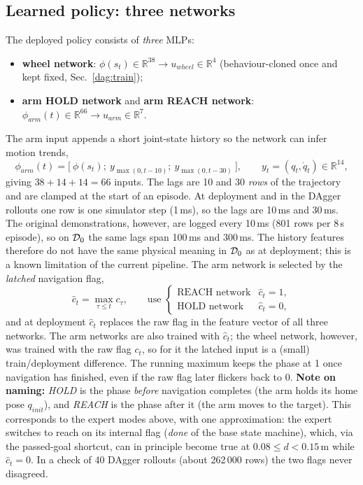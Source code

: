 \subsection{Learned policy: three networks}
\label{dag:policy}

The deployed policy consists of \emph{three} MLPs:
\begin{itemize}
  \item \textbf{wheel network}: $\phi(s_t)\in\mathbb{R}^{38}\to u_{wheel}\in\mathbb{R}^4$ (behaviour-cloned once and kept fixed, Sec.~\ref{dag:train});
  \item \textbf{arm HOLD network} and \textbf{arm REACH network}: $\phi_{arm}(t)\in\mathbb{R}^{66}\to u_{arm}\in\mathbb{R}^7$.
\end{itemize}
The arm input appends a short joint-state history so the network can infer motion trends,
\begin{equation}
  \phi_{arm}(t)=\bigl[\ \phi(s_t);\ y_{\max(0,t-10)};\ y_{\max(0,t-30)}\ \bigr],\qquad y_t=(q_t,\dot q_t)\in\mathbb{R}^{14},
  \label{dag:lags}
\end{equation}
giving $38+14+14=66$ inputs. The lags are 10 and 30 \emph{rows} of the trajectory and are clamped at the start of an episode. At deployment and in the DAgger rollouts one row is one simulator step (1\,ms), so the lags are 10\,ms and 30\,ms. The original demonstrations, however, are logged every 10\,ms (801 rows per 8\,s episode), so on $\mathcal{D}_0$ the same lags span 100\,ms and 300\,ms. The history features therefore do not have the same physical meaning in $\mathcal{D}_0$ as at deployment; this is a known limitation of the current pipeline. The arm network is selected by the \emph{latched} navigation flag,
\begin{equation}
  \hat c_t=\max_{\tau\le t}c_\tau,\qquad
  \text{use }\begin{cases}\text{REACH network}&\hat c_t=1,\\ \text{HOLD network}&\hat c_t=0,\end{cases}
  \label{dag:latch}
\end{equation}
and at deployment $\hat c_t$ replaces the raw flag in the feature vector of all three networks. The arm networks are also trained with $\hat c_t$; the wheel network, however, was trained with the raw flag $c_t$, so for it the latched input is a (small) train/deployment difference. The running maximum keeps the phase at 1 once navigation has finished, even if the raw flag later flickers back to 0. \textbf{Note on naming:} \emph{HOLD} is the phase \emph{before} navigation completes (the arm holds its home pose $q_{init}$), and \emph{REACH} is the phase after it (the arm moves to the target). This corresponds to the expert modes above, with one approximation: the expert switches to reach on its internal flag (\emph{done} of the base state machine), which, via the passed-goal shortcut, can in principle become true at $0.08\le d<0.15$\,m while $\hat c_t=0$. In a check of 40 DAgger rollouts (about 262\,000 rows) the two flags never disagreed.

